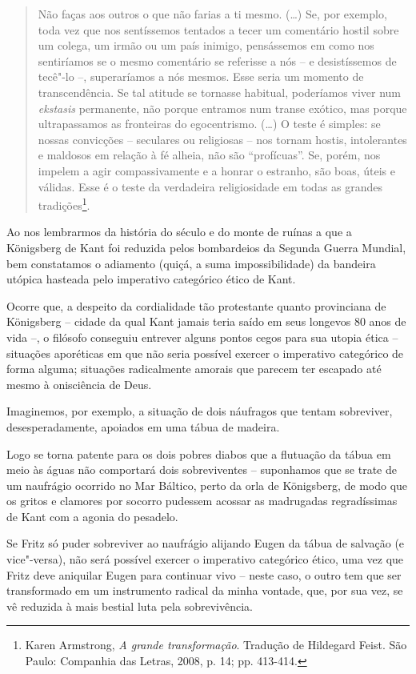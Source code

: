 \begin{quote}
Não faças aos outros o que não farias a ti mesmo. (\ldots{}) Se, por exemplo,
toda vez que nos sentíssemos tentados a tecer um comentário hostil sobre
um colega, um irmão ou um país inimigo, pensássemos em como nos
sentiríamos se o mesmo comentário se referisse a nós -- e desistíssemos
de tecê"-lo --, superaríamos a nós mesmos. Esse seria um momento de
transcendência. Se tal atitude se tornasse habitual, poderíamos viver
num \emph{ekstasis} permanente, não porque entramos num transe exótico,
mas porque ultrapassamos as fronteiras do egocentrismo. (\ldots{}) O teste é
simples: se nossas convicções -- seculares ou religiosas -- nos tornam
hostis, intolerantes e maldosos em relação à fé alheia, não são
``profícuas''. Se, porém, nos impelem a agir compassivamente e a honrar
o estranho, são boas, úteis e válidas. Esse é o teste da verdadeira
religiosidade em todas as grandes tradições\footnote{Karen Armstrong,
  \emph{A grande transformação}. Tradução de Hildegard Feist. São Paulo:
  Companhia das Letras, 2008, p. 14; pp. 413-414.}.
\end{quote}

Ao nos lembrarmos da história do século  e do monte de ruínas a que a
Königsberg de Kant foi reduzida pelos bombardeios da Segunda Guerra
Mundial, bem constatamos o adiamento (quiçá, a suma impossibilidade) da
bandeira utópica hasteada pelo imperativo categórico ético de Kant.

Ocorre que, a despeito da cordialidade tão protestante quanto
provinciana de Königsberg -- cidade da qual Kant jamais teria saído em
seus longevos 80 anos de vida --, o filósofo conseguiu entrever alguns
pontos cegos para sua utopia ética -- situações aporéticas em que não
seria possível exercer o imperativo categórico de forma alguma;
situações radicalmente amorais que parecem ter escapado até mesmo à
onisciência de Deus.

Imaginemos, por exemplo, a situação de dois náufragos que tentam
sobreviver, desesperadamente, apoiados em uma tábua de madeira.

Logo se torna patente para os dois pobres diabos que a flutuação da
tábua em meio às águas não comportará dois sobreviventes -- suponhamos
que se trate de um naufrágio ocorrido no Mar Báltico, perto da orla de
Königsberg, de modo que os gritos e clamores por socorro pudessem
acossar as madrugadas regradíssimas de Kant com a agonia do pesadelo.

Se Fritz só puder sobreviver ao naufrágio alijando Eugen da tábua de
salvação (e vice"-versa), não será possível exercer o imperativo
categórico ético, uma vez que Fritz deve aniquilar Eugen para continuar
vivo -- neste caso, o outro tem que ser transformado em um instrumento
radical da minha vontade, que, por sua vez, se vê reduzida à mais
bestial luta pela sobrevivência.


